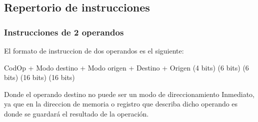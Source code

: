 \subsection{Repertorio de instrucciones}

\subsubsection{Instrucciones de 2 operandos}
El formato de instruccion de dos operandos es el siguiente:

  CodOp   +  Modo destino +  Modo origen +  Destino  +   Origen
(4 bits)       (6 bits)        (6 bits)    (16 bits)    (16 bits)  

Donde el operando destino no puede ser un modo de direccionamiento Inmediato, ya que en la direccion de memoria o registro que describa dicho operando es donde se guardará el resultado de la operación.

